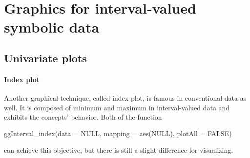 \documentclass[article]{jss}
\begin{document}
\section{Graphics for interval-valued symbolic data} \label{sec:graphics}


\subsection{Univariate plots}


\paragraph{Index plot} 
Another graphical technique, called index plot, is famous in conventional data as well. It is composed of minimum and maximum in interval-valued data and exhibits the concepts' behavior. Both of the function

\begin{CodeChunk}
\begin{CodeInput}
ggInterval_index(data = NULL, mapping = aes(NULL), plotAll = FALSE)
\end{CodeInput}
\end{CodeChunk}
can achieve this objective, but there is still a slight difference for visualizing. 
\end{document}
